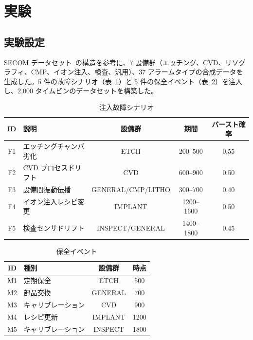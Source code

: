 \documentclass[11pt]{article}
\begin{document}
\section{実験}\label{sec:experiments}

\subsection{実験設定}

SECOM データセット~\citep{he2007secom}の構造を参考に、7 設備群（エッチング、CVD、リソグラフィ、CMP、イオン注入、検査、汎用）、37 アラームタイプの合成データを生成した。5 件の故障シナリオ（表~\ref{tab:faults}）と 5 件の保全イベント（表~\ref{tab:events}）を注入し、2{,}000 タイムビンのデータセットを構築した。

\begin{table}[t]
\centering
\caption{注入故障シナリオ}
\label{tab:faults}
\begin{tabular}{clccc}
\toprule
ID & 説明 & 設備群 & 期間 & バースト確率 \\
\midrule
F1 & エッチングチャンバ劣化 & ETCH & 200--500 & 0.55 \\
F2 & CVD プロセスドリフト & CVD & 600--900 & 0.50 \\
F3 & 設備間振動伝播 & GENERAL/CMP/LITHO & 300--700 & 0.40 \\
F4 & イオン注入レシピ変更 & IMPLANT & 1200--1600 & 0.50 \\
F5 & 検査センサドリフト & INSPECT/GENERAL & 1400--1800 & 0.45 \\
\bottomrule
\end{tabular}
\end{table}

\begin{table}[t]
\centering
\caption{保全イベント}
\label{tab:events}
\begin{tabular}{clcc}
\toprule
ID & 種別 & 設備群 & 時点 \\
\midrule
M1 & 定期保全 & ETCH & 500 \\
M2 & 部品交換 & GENERAL & 700 \\
M3 & キャリブレーション & CVD & 900 \\
M4 & レシピ更新 & IMPLANT & 1200 \\
M5 & キャリブレーション & INSPECT & 1800 \\
\bottomrule
\end{tabular}
\end{table}
\end{document}
